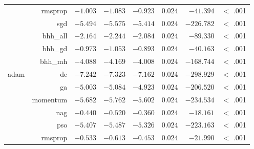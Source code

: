 \begin{table}[htbp]
{\begin{tabular}{lrrrrrrr}
			                     & rmsprop              & $-1.003$             & $-1.083$                                        & $-0.923$             & $0.024$              & $-41.394$            & $<$ .001    \\
			                     & sgd                  & $-5.494$             & $-5.575$                                        & $-5.414$             & $0.024$              & $-226.782$           & $<$ .001    \\
			                     & bhh\_all             & $-2.164$             & $-2.244$                                        & $-2.084$             & $0.024$              & $-89.330$            & $<$ .001    \\
			                     & bhh\_gd              & $-0.973$             & $-1.053$                                        & $-0.893$             & $0.024$              & $-40.163$            & $<$ .001    \\
			                     & bhh\_mh              & $-4.088$             & $-4.169$                                        & $-4.008$             & $0.024$              & $-168.744$           & $<$ .001    \\
			adam                 & de                   & $-7.242$             & $-7.323$                                        & $-7.162$             & $0.024$              & $-298.929$           & $<$ .001    \\
			$ $                  & ga                   & $-5.003$             & $-5.084$                                        & $-4.923$             & $0.024$              & $-206.520$           & $<$ .001    \\
			                     & momentum             & $-5.682$             & $-5.762$                                        & $-5.602$             & $0.024$              & $-234.534$           & $<$ .001    \\
			                     & nag                  & $-0.440$             & $-0.520$                                        & $-0.360$             & $0.024$              & $-18.161$            & $<$ .001    \\
			                     & pso                  & $-5.407$             & $-5.487$                                        & $-5.326$             & $0.024$              & $-223.163$           & $<$ .001    \\
			                     & rmsprop              & $-0.533$             & $-0.613$                                        & $-0.453$             & $0.024$              & $-21.990$            & $<$ .001    \\

\end{tabular}}
\end{table}

